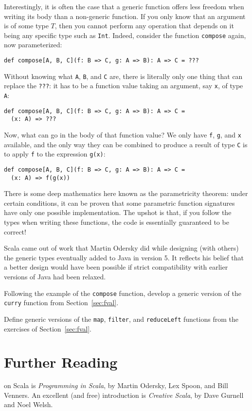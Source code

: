 Interestingly, it is often the case that a generic function offers less freedom when writing its body than a non-generic function. If you only know that an argument is of some type $T$, then you cannot perform any operation that depends on it being any specific type such as \verb|Int|. Indeed, consider the function \verb|compose| again, now parameterized:
\begin{verbatim}
def compose[A, B, C](f: B => C, g: A => B): A => C = ???
\end{verbatim}
Without knowing what \verb|A|, \verb|B|, and \verb|C| are, there is literally only one thing that can replace the \verb|???|: it has to be a function value taking an argument, say \verb|x|, of type \verb|A|:
\begin{verbatim}
def compose[A, B, C](f: B => C, g: A => B): A => C =
  (x: A) => ???
\end{verbatim}
Now, what can go in the body of that function value? We only have \verb|f|, \verb|g|, and \verb|x| available, and the only way they can be combined to produce a result of type \verb|C| is to apply \verb|f| to the expression \verb|g(x)|:
\begin{verbatim}
def compose[A, B, C](f: B => C, g: A => B): A => C =
  (x: A) => f(g(x))
\end{verbatim}
There is some deep mathematics here known as the parametricity theorem: under certain conditions, it can be proven that some parametric function signatures have only one possible implementation. The upshot is that, if you follow the types when writing these functions, the code is essentially guaranteed to be correct!

\begin{tailquote}
Scala came out of work that Martin Odersky did while designing (with others) the generic types eventually added to Java in version 5. It reflects his belief that a better design would have been possible if strict compatibility with earlier versions of Java had been relaxed.
\end{tailquote}
\begin{exercises}
\item Following the example of the \verb|compose| function, develop a generic version of the \verb|curry| function from Section~\ref{sec:fval}.

\item Define generic versions of the \texttt{map}, \texttt{filter}, and \texttt{reduceLeft} functions from the exercises of Section~\ref{sec:fval}.
\end{exercises}

\section{Further Reading}
 on Scala is \textit{Programming in Scala}, by Martin Odersky, Lex Spoon, and Bill Venners\cite{odersky2016pis}. An excellent (and free) introduction is \textit{Creative Scala}, by Dave Gurnell and Noel Welsh\cite{gurnell2017cs}.

